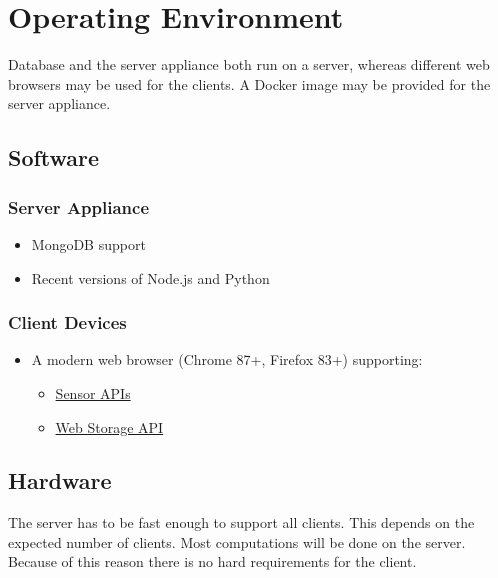 \section{Operating Environment}
Database and the server appliance both run on a server, whereas different web browsers may be used for the clients. A Docker image may be provided for the server appliance.

\subsection{Software}
\subsubsection{Server Appliance}
\begin{itemize}
    \item MongoDB support
    \item Recent versions of Node.js and Python 
\end{itemize}
\subsubsection{Client Devices}
\begin{itemize}
    \item A modern web browser (Chrome 87+, Firefox 83+) supporting: %
    \begin{itemize}
        \item \href{https://developer.mozilla.org/en-US/docs/Web/API/Sensor_APIs}{Sensor APIs}
        \item \href{https://developer.mozilla.org/en-US/docs/Web/API/Web_Storage_API}{Web Storage API}
    \end{itemize}
\end{itemize}

\subsection{Hardware} %
The server has to be fast enough to support all clients. This depends on the expected number of clients. Most computations will be done on the server. Because of this reason there is no hard requirements for the client.
